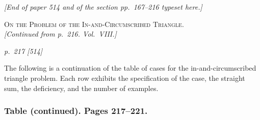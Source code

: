 \documentclass[11pt,a4paper]{book}
\begin{document}

\textit{[End of paper 514 and of the section pp.\ 167--216 typeset here.]}
\clearpage



\begin{center}
\textsc{On the Problem of the In-and-Circumscribed Triangle.}\\
\textit{[Continued from p.~216.  Vol.\ VIII.]}
\end{center}

\bigskip
\textit{p.~217 [514]}
\smallskip

\noindent
The following is a continuation of the table of cases for the in-and-circumscribed
triangle problem.  Each row exhibits the specification of the case, the straight
sum, the deficiency, and the number of examples.

\subsubsection*{Table (continued).  Pages 217--221.}
\end{document}
